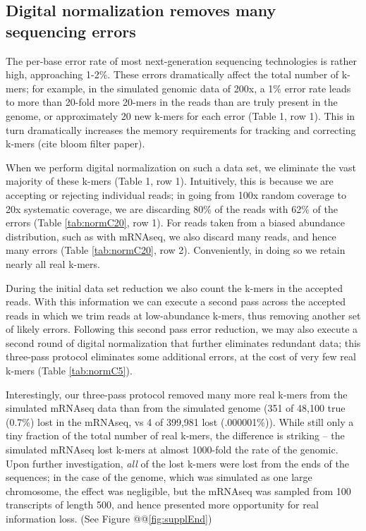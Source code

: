 \documentclass[10pt,draft]{article}
\begin{document}
\subsection*{Digital normalization removes many sequencing errors}

The per-base error rate of most next-generation sequencing technologies
is rather high, approaching 1-2\%.  
These
errors dramatically affect the total number of k-mers; for example, in the
simulated genomic data of 200x, a 1\% error rate leads to more than
20-fold more 20-mers in the reads than are truly present in the genome,
or approximately 20 new k-mers for each error (Table 1, row 1).
This in turn dramatically increases the memory requirements for
tracking and correcting k-mers (cite bloom filter paper).

When we perform digital normalization on such a data set, we eliminate
the vast majority of these k-mers (Table 1, row 1).  Intuitively, this is
because we are accepting or rejecting individual reads; in going from
100x random coverage to 20x systematic coverage, we are discarding
80\% of the reads with 62\% of the errors (Table \ref{tab:normC20}, row 1).
For reads taken from a biased abundance distribution, such as with
mRNAseq, we also discard many reads, and hence many errors (Table \ref{tab:normC20}, row 2).
Conveniently, in doing so we retain nearly all real k-mers.

During the initial data set reduction we also count the k-mers in the
accepted reads.  With this information we can execute a second pass
across the accepted reads in which we trim reads at low-abundance
k-mers, thus removing another set of likely errors.  Following this
second pass error reduction, we may also execute a second round of
digital normalization that further eliminates redundant data; this
three-pass protocol eliminates some additional errors, at the cost
of very few real k-mers (Table \ref{tab:normC5}).

Interestingly, our three-pass protocol removed many more real k-mers
from the simulated mRNAseq data than from the simulated genome (351 of
48,100 true (0.7\%) lost in the mRNAseq, vs 4 of 399,981 lost
(.000001\%)).  While still only a tiny fraction of the total number of
real k-mers, the difference is striking -- the simulated mRNAseq lost
k-mers at almost 1000-fold the rate of the genomic.  Upon further
investigation, {\em all} of the lost k-mers were lost from the ends
of the sequences; in the case of the genome, which was simulated as
one large chromosome, the effect was negligible, but the mRNAseq
was sampled from 100 transcripts of length 500, and hence presented
more opportunity for real information loss.  (See Figure @@\ref{fig:supplEnd})
\end{document}
